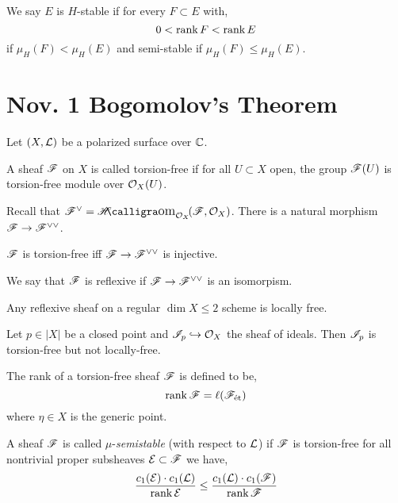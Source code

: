 \documentclass[12pt]{article}
\begin{document}
\begin{defn}
We say $E$ is $H$-stable if for every $F \subset E$ with,
\[ 0 < \operatorname{\mathrm{rank}}{F} < \operatorname{\mathrm{rank}}{E} \]
if $\mu_H(F) < \mu_H(E)$ and semi-stable if $\mu_H(F) \le \mu_H(E)$. 
\end{defn}

\section{Nov. 1 Bogomolov's Theorem}

Let $(X, \mathcal{L})$ be a polarized surface over $\mathbb{C}$.

\begin{defn}
A sheaf $\mathscr{F}$ on $X$ is called torsion-free if for all $U \subset X$ open, the group $\mathscr{F}(U)$ is torsion-free module over $\mathcal{O}_{X}(U)$.
\end{defn}

\begin{rmk}
Recall that $\F^\vee = \shHom{\struct{X}}{\F}{\struct{X}}$. There is a natural morphism $\mathscr{F} \to \mathscr{F}^{\vee \vee}$.
\end{rmk}

\begin{prop}
$\mathscr{F}$ is torsion-free iff $\mathscr{F} \to \mathscr{F}^{\vee \vee}$ is injective.
\end{prop}

\begin{defn}
We say that $\mathscr{F}$ is reflexive if $\mathscr{F} \to \mathscr{F}^{\vee \vee}$ is an isomorpism.
\end{defn}

\begin{prop}
Any reflexive sheaf on a regular $\dim{X} \le 2$ scheme is locally free.
\end{prop}

\begin{example}
Let $p \in |X|$ be a closed point and $\mathscr{I}_p \hookrightarrow \mathcal{O}_{X}$ the sheaf of ideals. Then $\mathscr{I}_p$ is torsion-free but not locally-free. 
\end{example}

\begin{defn}
The rank of a torsion-free sheaf $\mathscr{F}$ is defined to be,
\[ \operatorname{\mathrm{rank}}{\mathscr{F}} = \ell(\mathscr{F}_{\text{\'{e}t}}) \]
where $\eta \in X$ is the generic point.
\end{defn}

\begin{defn}
A sheaf $\mathscr{F}$ is called $\mu$-\textit{semistable} (with respect to $\mathcal{L}$) if $\mathscr{F}$ is torsion-free for all nontrivial proper subsheaves $\mathcal{E} \subset \mathscr{F}$ we have,
\[ \frac{c_1(\mathcal{E}) \cdot c_1(\mathcal{L})}{\operatorname{\mathrm{rank}}{\mathcal{E}}} \le \frac{c_1(\mathcal{L}) \cdot c_1(\mathscr{F})}{\operatorname{\mathrm{rank}}{\mathscr{F}}} \]
\end{defn}
\end{document}
